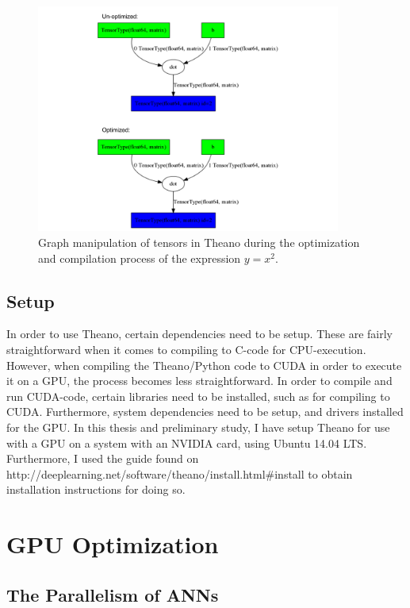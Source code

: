\begin{figure}
\centering
\includegraphics[width=10cm]{fig/unopt_opt_theano_graph}
\caption{Graph manipulation of tensors in Theano during the optimization and compilation process of the expression $y = x^2$.}
\label{fig:theano_graph_demo}
\end{figure}

\subsection{Setup}

In order to use Theano, certain dependencies need to be setup. These are fairly straightforward when it comes to compiling to C-code for CPU-execution. However, when compiling the Theano/Python code to CUDA in order to execute it on a GPU, the process becomes less straightforward. In order to compile and run CUDA-code, certain libraries need to be installed, such as for compiling to CUDA. Furthermore, system dependencies need to be setup, and drivers installed for the GPU. In this thesis and preliminary study, I have setup Theano for use with a GPU on a system with an NVIDIA card, using Ubuntu 14.04 LTS. Furthermore, I used the guide found on \\http://deeplearning.net/software/theano/install.html\#install to obtain installation instructions for doing so.

\section{GPU Optimization}

\subsection{The Parallelism of ANNs}

